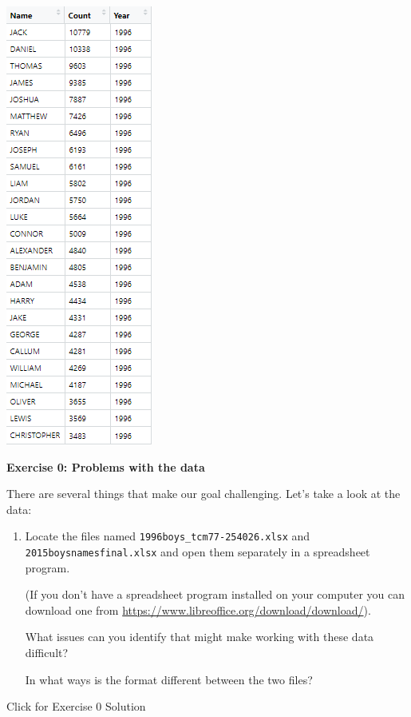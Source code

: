 \documentclass[
]{book}
\begin{document}
\includegraphics{R/RDataWrangling/images/goal.png}

\textbf{Exercise 0: Problems with the data}

There are several things that make our goal challenging. Let's take a look at the data:

\begin{enumerate}
\def\labelenumi{\arabic{enumi}.}
\item
  Locate the files named \texttt{1996boys\_tcm77-254026.xlsx} and
  \texttt{2015boysnamesfinal.xlsx} and open them separately in a
  spreadsheet program.

  (If you don't have a spreadsheet program installed on
  your computer you can download one from
  \url{https://www.libreoffice.org/download/download/}).

  What issues can you identify that might make working
  with these data difficult?

  In what ways is the format different between the two files?
\end{enumerate}

{Click for Exercise 0 Solution}
\end{document}
